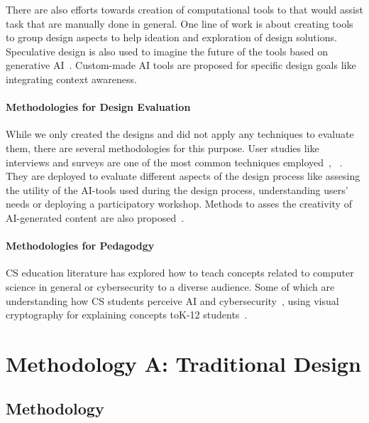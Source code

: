 There are also efforts towards creation of computational tools to that would assist task that are manually done in general. One line of work is about creating tools to group design aspects to help ideation and exploration of design solutions\cite{huang_designnet_2023}. Speculative design is also used to imagine the future of the tools based on generative AI~\cite{lin_generative_2023}. Custom-made AI tools are proposed for specific design goals like integrating context awareness\cite{fan_contextcam_2024}.

\paragraph{Methodologies for Design Evaluation} 
While we only created the designs and did not apply any techniques to evaluate them, there are several methodologies for this purpose. User studies like interviews and surveys are one of the most common techniques employed~\cite{sanchez_examining_2023}, ~\cite{chang_prompt_2023}. They are deployed to evaluate different aspects of the design process like assesing the utility of the AI-tools used during the design process, understanding users' needs or deploying a participatory workshop. Methods to asses the creativity of AI-generated content are also proposed~\cite{chakrabarty_art_2024}.

\paragraph{Methodologies for Pedagodgy} 
CS education literature has explored how to teach concepts related to computer science in general or cybersecurity to a diverse audience. Some of which are understanding how CS students perceive AI and cybersecurity~\cite{ojha_computing_2023}, using visual cryptography for explaining concepts toK-12 students~\cite{rayavaram_designing_2023}.



\section{Methodology A: Traditional Design}
\label{sec:meth1}

\subsection{Methodology}


